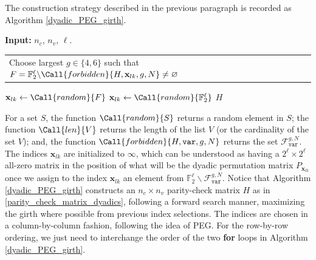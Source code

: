 \documentclass[11pt]{article}
\makeatletter
\newcommand{\Input}{\State \textbf{Input: }}
\theoremstyle{plain}
\theoremstyle{plain}
\newcommand{\multiline}[1]{%
  \begin{tabularx}{\dimexpr\linewidth-\ALG@thistlm}[t]{@{}X@{}}
    #1
  \end{tabularx}
}
\theoremstyle{definition}
\numberwithin{theo}{section}
\newcommand{\bx}{{\mathbf x}}
\newcounter{ara}
\newcounter{rom}
\makeatother
\begin{document}
The construction strategy described in the previous paragraph is recorded as Algorithm \ref{dyadic_PEG_girth}.
\begin{algorithm}[t]
\caption{Quasi-dyadic PEG algorithm with forbidden sets}
\label{dyadic_PEG_girth}
\begin{algorithmic}[0]
\Input{$n_c$, $n_v$, $\ell$.}
\State{Initialize indices $\bx_{lk}=\infty$, $l\in[n_c]$, $k\in[n_v]$.}
		\State \multiline{Choose largest $g\in\{4,6\}$ such that $F=\mathbb{F}_2^\ell\backslash\Call{forbidden}{H,\bx_{lk},g,N}\neq\varnothing$}
			\State $\bx_{lk} \gets \Call{random}{F}$	
		\Else
			\State $\bx_{lk} \gets \Call{random}{\mathbb{F}_2^\ell}$	
		\EndIf
	\EndFor
\EndFor
\State \Return $H$
\end{algorithmic}
\end{algorithm}
For a set $S$, the function $\Call{random}{S}$ returns a random element in $S$; the function $\Call{len}{V}$ returns the length of the list $V$ (or the cardinality of the set $V$); and, the function $\Call{forbidden}{H,\texttt{var},g,N}$ returns the set $\mathcal{F}_{\texttt{var}}^{g,N}$. The indices $\bx_{lk}$ are initialized to $\infty$, which can be understood as having a $2^\ell\times2^\ell$ all-zero matrix in the position of what will be the dyadic permutation matrix $P_{\bx_{lk}}$ once we assign to the index $\bx_{lk}$ an element from $\mathbb{F}_2^\ell\backslash\mathcal{F}_{\texttt{var}}^{g,N}$. Notice that Algorithm \ref{dyadic_PEG_girth} constructs an $n_c\times n_v$ parity-check matrix $H$ as in \eqref{parity_check_matrix_dyadics}, following a forward search manner, maximizing the girth where possible from previous index selections. The indices are chosen in a column-by-column fashion, following the idea of PEG. For the row-by-row ordering, we just need to interchange the order of the two \textbf{for} loops in Algorithm \ref{dyadic_PEG_girth}.
\end{document}
